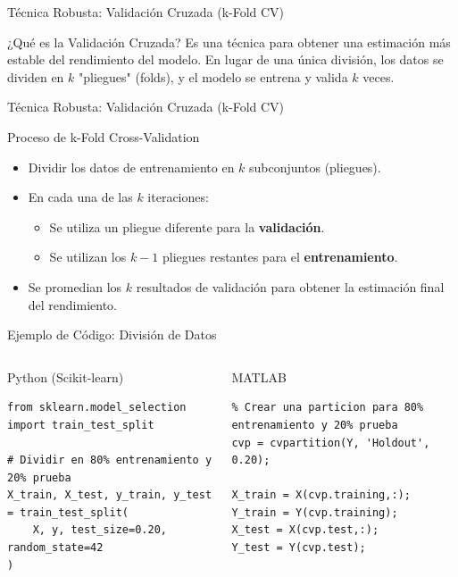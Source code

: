 \documentclass[aspectratio=169,xcolor=dvipsnames]{beamer}
\begin{document}
\begin{frame}{Técnica Robusta: Validación Cruzada (k-Fold CV)}
    \begin{block}{¿Qué es la Validación Cruzada?}
    Es una técnica para obtener una estimación más estable del rendimiento del modelo. En lugar de una única división, los datos se dividen en $k$ "pliegues" (folds), y el modelo se entrena y valida $k$ veces.
    \end{block}
\end{frame}
\begin{frame}{Técnica Robusta: Validación Cruzada (k-Fold CV)}

    \begin{alertblock}{Proceso de k-Fold Cross-Validation}
        \begin{itemize}
            \item Dividir los datos de entrenamiento en $k$ subconjuntos (pliegues).
            \item En cada una de las $k$ iteraciones:
                \begin{itemize}
                    \item Se utiliza un pliegue diferente para la \textbf{validación}.
                    \item Se utilizan los $k-1$ pliegues restantes para el \textbf{entrenamiento}.
                \end{itemize}
            \item Se promedian los $k$ resultados de validación para obtener la estimación final del rendimiento.
        \end{itemize}
    \end{alertblock}
\end{frame}

\begin{frame}[fragile]{Ejemplo de Código: División de Datos}
    \begin{columns}[t]
            \begin{block}{Python (Scikit-learn)}
                \begin{lstlisting}
from sklearn.model_selection import train_test_split

# Dividir en 80% entrenamiento y 20% prueba
X_train, X_test, y_train, y_test = train_test_split(
    X, y, test_size=0.20, random_state=42
)
                \end{lstlisting}
            \end{block}

            \begin{alertblock}{MATLAB}
                 \begin{lstlisting}
% Crear una particion para 80% entrenamiento y 20% prueba
cvp = cvpartition(Y, 'Holdout', 0.20);

X_train = X(cvp.training,:);
Y_train = Y(cvp.training);
X_test = X(cvp.test,:);
Y_test = Y(cvp.test);
                \end{lstlisting}
            \end{alertblock}
    \end{columns}
\end{frame}
\end{document}

